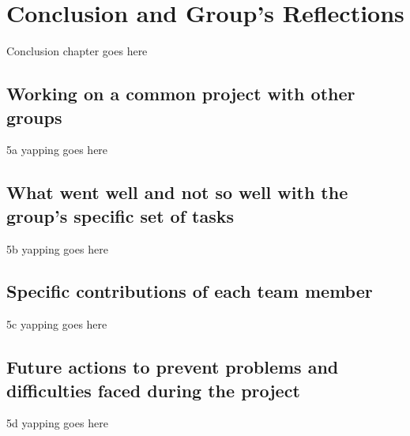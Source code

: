 \documentclass[12pt]{report}
\begin{document}
\chapter{Conclusion and Group's Reflections}
Conclusion chapter goes here

\section{Working on a common project with other groups}
5a yapping goes here

\section{What went well and not so well with the group's specific set of tasks}
5b yapping goes here

\section{Specific contributions of each team member}
5c yapping goes here

\section{Future actions to prevent problems and difficulties faced during the project}
5d yapping goes here
\end{document}

